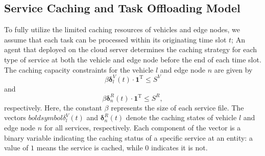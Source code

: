 \documentclass[lettersize,journal]{IEEEtran}
\begin{document}
\subsection{Service Caching and Task Offloading Model} \label{Service Caching and Computation Offloading Model}
To fully utilize the limited caching resources of vehicles and edge nodes, we assume that each task can be processed within its originating time slot $ t $;
An agent that deployed on the cloud server determines the caching strategy for each type of service at both the vehicle and edge node  before the end of each time slot. The caching capacity constraints for the vehicle $ l $ and edge node $ n $ are given by 
\begin{equation}
	\label{equ: cache constraint 1}
	\beta \boldsymbol{\delta}^{V}_{l}(t) \cdot \mathbf{1}^{\mathrm{T}}  \le S^{V}
\end{equation}
and 
\begin{equation}
	\label{equ: cache constraint 2}
	\beta \boldsymbol{\delta}^{R}_{n}(t) \cdot \mathbf{1}^{\mathrm{T}}  \le S^{R},
\end{equation}
respectively.
Here, the constant $ \beta $ represents the size of each service file.
The vectors $ boldsymbol{\delta}^{V}_{l}(t) $ and $ \boldsymbol{\delta}^{R}_{n}(t) $ denote the caching states of vehicle $ l $ and edge node $ n $ for all services, respectively. 
Each component of the  vector is a binary variable indicating the caching status of a specific service at an entity: a value of $ 1 $ means the service is cached, while $ 0  $ indicates it is not.
\end{document}
